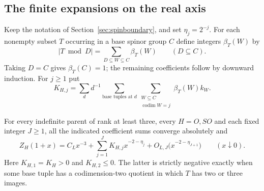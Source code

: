 \subsection{The finite expansions on the real axis}\label{sec:indorders}
Keep the notation of Section~\ref{sec:spinboundary}, and set $\eta_j=2^{-j}$. For each nonempty subset $T$ occurring in a base spinor group $C$ define integers $\beta_T(W)$ by
\[
 |T\bmod D|=\sum_{D\subseteq W\subseteq C}\beta_T(W)
 \qquad (D\subseteq C).
\]
Taking $D=C$ gives $\beta_T(C)=1$; the remaining coefficients follow by downward induction. For $j\ge1$ put
\[
 K_{H,j}=\sum_d d^{-1}\sum_{\text{base tuples at }d}
       \sum_{\substack{W\subseteq C\\\operatorname{codim} W=j}}\beta_T(W)k_W.
\]

\begin{theorem}\label{th:indorders}
For every indefinite parent of rank at least three, every $H=O,SO$ and each fixed integer $J\ge1$, all the indicated coefficient sums converge absolutely and
\[
 Z_H(1+x)=C_L x^{-3}
       +\sum_{j=1}^J K_{H,j} x^{-2-\eta_j}
       +O_{L,J}\bigl(x^{-2-\eta_{J+1}}\bigr)
       \qquad(x\downarrow0).
\]
Here $K_{H,1}=K_H>0$ and $K_{H,2}\le0$. The latter is strictly negative exactly when some base tuple has a codimension-two quotient in which $T$ has two or three images.
\end{theorem}
